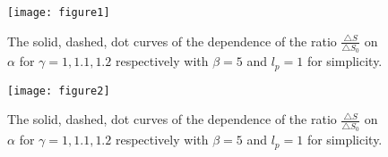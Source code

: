 \documentclass[graphicx, 12pt]{article}
\begin{document}
\newpage
\begin{figure}
\setlength{\belowcaptionskip}{10pt} \centering
\texttt{[image: figure1]}
\caption{The solid, dashed, dot curves of the dependence of the
ratio $\frac{\bigtriangleup S}{\bigtriangleup S_{0}}$ on $\alpha$
for $\gamma=1, 1.1, 1.2$ respectively with $\beta=5$ and $l_{p}=1$
for simplicity.}
\end{figure}


\newpage
\begin{figure}
\setlength{\belowcaptionskip}{10pt} \centering
\texttt{[image: figure2]}
\caption{The solid, dashed, dot curves of the dependence of the
ratio $\frac{\bigtriangleup S}{\bigtriangleup S_{0}}$ on $\alpha$
for $\gamma=1, 1.1, 1.2$ respectively with $\beta=5$ and $l_{p}=1$
for simplicity.}
\end{figure}
\end{document}
